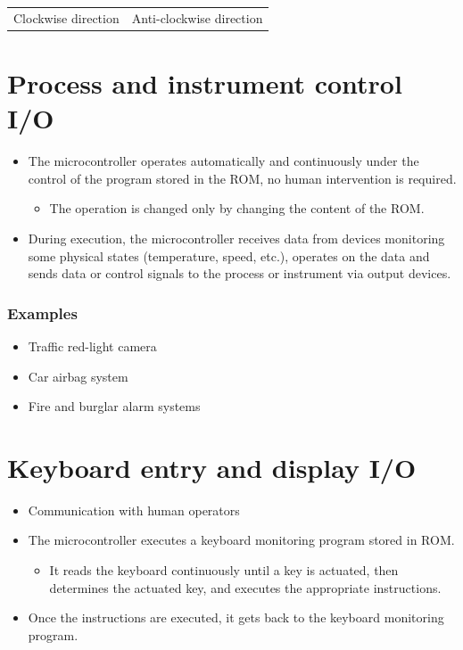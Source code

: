 \documentclass[11pt]{article}
\begin{document}
\begin{center}
\begin{tabular}{>{\centering\arraybackslash}m{} >{\centering\arraybackslash}m{}}
Clockwise direction & Anti-clockwise direction\\
\end{tabular}
\end{center}
\section{Process and instrument control I/O}
\label{sec:org5e4a5a7}
\begin{itemize}
\item The microcontroller operates automatically and continuously under the control of the program stored in the ROM, no human intervention is required.
\begin{itemize}
\item The operation is changed only by changing the content of the ROM.
\end{itemize}
\item During execution, the microcontroller receives data from devices monitoring some physical states (temperature, speed, etc.), operates on the data and sends data or control signals to the process or instrument via output devices.
\end{itemize}
\subsubsection{Examples}
\label{sec:org7a21ec9}
\begin{itemize}
\item Traffic red-light camera
\item Car airbag system
\item Fire and burglar alarm systems
\end{itemize}

 \newpage
\section{Keyboard entry and display I/O}
\label{sec:org6b49481}
\begin{itemize}
\item Communication with human operators
\item The microcontroller executes a keyboard monitoring program stored in ROM.
\begin{itemize}
\item It reads the keyboard continuously until a key is actuated, then determines the actuated key, and executes the appropriate instructions.
\end{itemize}
\item Once the instructions are executed, it gets back to the keyboard monitoring program.
\end{itemize}
\end{document}
